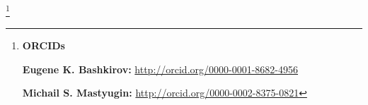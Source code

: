 \makeentitle





\thanks{{\bf ORCIDs}



{\bf Eugene K. Bashkirov:} \url{http://orcid.org/0000-0001-8682-4956}



{\bf Michail S. Mastyugin:} \url{http://orcid.org/0000-0002-8375-0821}







}



\newpage



\EngRef



